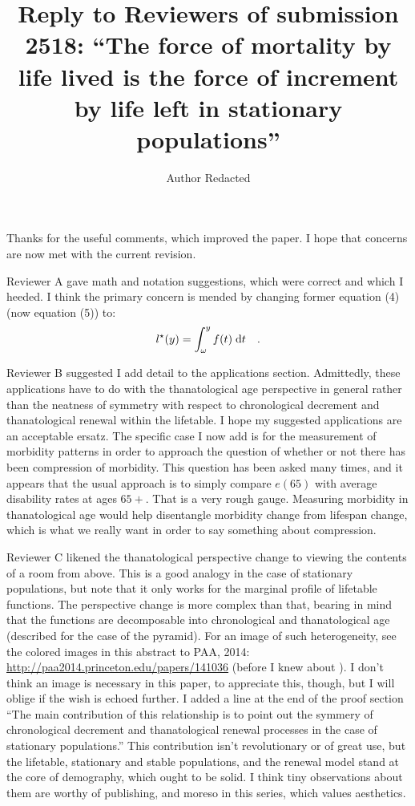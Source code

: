\documentclass{article}
\newcommand{\dd}{\; \mathrm{d}}
\begin{document}
\title{Reply to Reviewers of submission 2518: ``The force of mortality by life
lived is the force of increment by life left in stationary populations''}
\author{Author Redacted}
\maketitle
Thanks for the useful comments, which improved the paper. I
hope that concerns are now met with the current revision.

Reviewer A gave math and notation suggestions, which were correct and which I
heeded. I think the primary concern is mended by changing former equation (4)
(now equation (5)) to:
\begin{equation}
l^\star (y) = \int _\omega^y f(t) \dd t \notag \quad \text{.} 
\end{equation}

Reviewer B suggested I add detail to the applications section. Admittedly, these
applications have to do with the thanatological age perspective in general
rather than the neatness of symmetry with respect to chronological decrement and
thanatological renewal within the lifetable. I hope my suggested applications
are an acceptable ersatz. The specific case I now add is for the measurement of
morbidity patterns in order to approach the question of whether or not there
has been compression of morbidity. This question has been asked many times, and
it appears that the usual approach is to simply compare $e(65)$ with average
disability rates at ages $65+$. That is a very rough gauge. Measuring morbidity
in thanatological age would help disentangle morbidity change from lifespan change,
which is what we really want in order to say something about compression.

Reviewer C likened the thanatological perspective change to viewing the contents
of a room from above. This is a good analogy in the case of stationary
populations, but note that it only works for the marginal profile of lifetable
functions. The perspective change is more complex than that, bearing in mind
that the functions are decomposable into chronological and thanatological age
(described for the case of the pyramid). For an image of such heterogeneity, see
the colored images in this abstract to PAA, 2014: \url{http://paa2014.princeton.edu/papers/141036}
(before I knew about \citep{brouard1986structure}). I don't think an image is
necessary in this paper, to appreciate this, though, but I will oblige if the
wish is echoed further. I added a line at the end of the proof section ``The
main contribution of this relationship is to point out the symmery of chronological decrement and thanatological renewal processes in
the case of stationary populations.'' This contribution isn't revolutionary or
of great use, but the lifetable, stationary and stable populations, and the
renewal model stand at the core of demography, which ought to be
solid. I think tiny observations about them are worthy of publishing, and moreso
in this series, which values aesthetics. 
\end{document}
